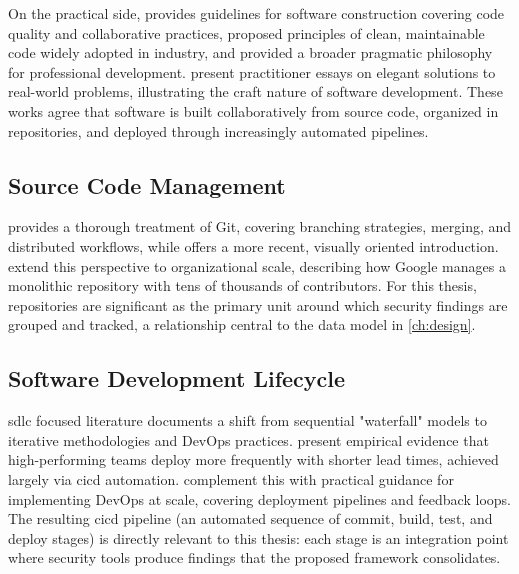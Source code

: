 On the practical side, \textcite{McConnell2004} provides guidelines for software construction covering code quality and collaborative practices, \textcite{Martin2008} proposed principles of clean, maintainable code widely adopted in industry, and \textcite{Hunt2019} provided a broader pragmatic philosophy for professional development. \textcite{Oram2007} present practitioner essays on elegant solutions to real-world problems, illustrating the craft nature of software development. These works agree that software is built collaboratively from source code, organized in repositories, and deployed through increasingly automated pipelines.


\subsection{Source Code Management}

\textcite{Chacon2014} provides a thorough treatment of Git, covering branching strategies, merging, and distributed workflows, while \textcite{Skoulikari2024} offers a more recent, visually oriented introduction. \textcite{Winters2020} extend this perspective to organizational scale, describing how Google manages a monolithic repository with tens of thousands of contributors. For this thesis, repositories are significant as the primary unit around which security findings are grouped and tracked, a relationship central to the data model in \autoref{ch:design}.


\subsection{Software Development Lifecycle}

\gls{sdlc} focused literature documents a shift from sequential "waterfall" models to iterative methodologies and DevOps practices. \textcite{Forsgren2018} present empirical evidence that high-performing teams deploy more frequently with shorter lead times, achieved largely via \gls{cicd} automation. \textcite{Kim2021} complement this with practical guidance for implementing DevOps at scale, covering deployment pipelines and feedback loops. The resulting \gls{cicd} pipe\-line (an automated sequence of commit, build, test, and deploy stages) is directly relevant to this thesis: each stage is an integration point where security tools produce findings that the proposed framework consolidates.

